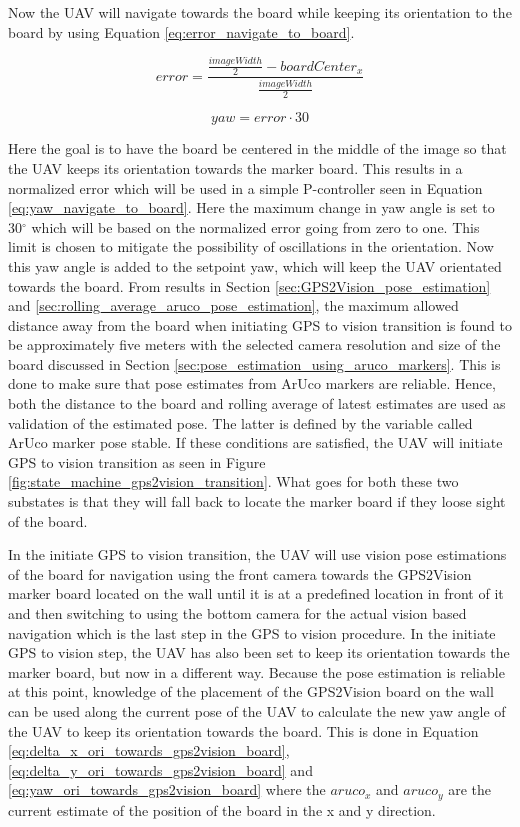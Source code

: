\documentclass[../Head/report.tex]{subfiles}
\begin{document}
Now the UAV will navigate towards the board while keeping its orientation to the board by using Equation \ref{eq:error_navigate_to_board}. 

\begin{equation}
	error = \frac{\frac{imageWidth}{2} - boardCenter_x}{\frac{imageWidth}{2}}
\label{eq:error_navigate_to_board}
\end{equation}    

\begin{equation}
	yaw = error \cdot 30
\label{eq:yaw_navigate_to_board}
\end{equation} 

Here the goal is to have the board be centered in the middle of the image so that the UAV keeps its orientation towards the marker board. This results in a normalized error which will be used in a simple P-controller seen in Equation \ref{eq:yaw_navigate_to_board}. Here the maximum change in yaw angle is set to 30$^{\circ}$ which will be based on the normalized error going from zero to one. This limit is chosen to mitigate the possibility of oscillations in the orientation. Now this yaw angle is added to the setpoint yaw, which will keep the UAV orientated towards the board. From results in Section \ref{sec:GPS2Vision_pose_estimation} and \ref{sec:rolling_average_aruco_pose_estimation}, the maximum allowed distance away from the board when initiating GPS to vision transition is found to be approximately five meters with the selected camera resolution and size of the board discussed in Section \ref{sec:pose_estimation_using_aruco_markers}. This is done to make sure that pose estimates from ArUco markers are reliable. Hence, both the distance to the board and rolling average of latest estimates are used as validation of the estimated pose. The latter is defined by the variable called ArUco marker pose stable. If these conditions are satisfied, the UAV will initiate GPS to vision transition as seen in Figure \ref{fig:state_machine_gps2vision_transition}.  What goes for both these two substates is that they will fall back to locate the marker board if they loose sight of the board. 

In the initiate GPS to vision transition, the UAV will use vision pose estimations of the board for navigation using the front camera towards the GPS2Vision marker board located on the wall until it is at a predefined location in front of it and then switching to using the bottom camera for the actual vision based navigation which is the last step in the GPS to vision procedure. In the initiate GPS to vision step, the UAV has also been set to keep its orientation towards the marker board, but now in a different way. Because the pose estimation is reliable at this point, knowledge of the placement of the GPS2Vision board on the wall can be used along the current pose of the UAV to calculate the new yaw angle of the UAV to keep its orientation towards the board. This is done in Equation \ref{eq:delta_x_ori_towards_gps2vision_board}, \ref{eq:delta_y_ori_towards_gps2vision_board} and \ref{eq:yaw_ori_towards_gps2vision_board} where the $aruco_x$ and $aruco_y$ are the current estimate of the position of the board in the x and y direction. 
\end{document}

